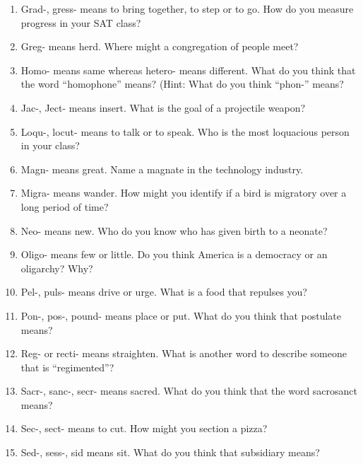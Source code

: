 \begin{enumerate}
\item Grad-, gress- means to bring together, to step or to go. How do you measure progress in your SAT class? \hrulefill

\item Greg- means herd. Where might a congregation of people meet? \hrulefill

\item Homo- means same whereas hetero- means different. What do you think that the word ``homophone'' means? \hrulefill (Hint: What do you think ``phon-'' means? \hrulefill

\item Jac-, Ject- means insert. What is the goal of a projectile weapon? \hrulefill

\item Loqu-, locut- means to talk or to speak. Who is the most loquacious person in your class? \hrulefill

\item Magn- means great. Name a magnate in the technology industry. \hrulefill

\item Migra- means wander. How might you identify if a bird is migratory over a long period of time? \hrulefill

\item Neo- means new. Who do you know who has given birth to a neonate? \hrulefill

\item Oligo- means few or little. Do you think America is a democracy or an oligarchy? Why? \hrulefill

\item Pel-, puls- means drive or urge. What is a food that repulses you? \hrulefill

\item  Pon-, pos-, pound- means place or put. What do you think that postulate means? \hrulefill

\item Reg- or recti- means straighten. What is another word to describe someone that is ``regimented''? \hrulefill

\item Sacr-, sanc-, secr- means sacred. What do you think that the word sacrosanct means? \hrulefill

 \item  Sec-, sect- means to cut. How might you section a pizza? \hrulefill

 \item Sed-, sess-, sid means sit. What do you think that subsidiary means? \hrulefill
 \end{enumerate}